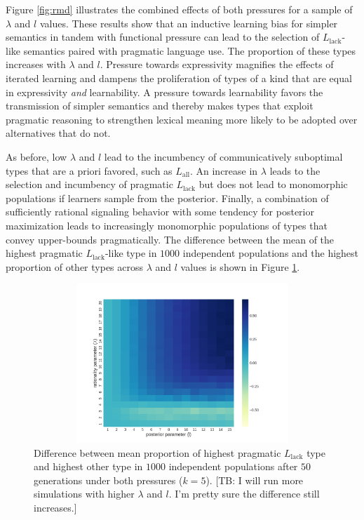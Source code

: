\documentclass[a4paper, 11pt]{article}
\newcommand{\tb}[1]{\textcolor[rgb]{.8,.33,.0}{[TB: #1]}}%
\newcommand{\mylang}[1]{\ensuremath{L_{\text{#1}}}\xspace} %
\newcommand{\Lall}{\mylang{all}}
\newcommand{\Llack}{\mylang{lack}}
\begin{document}
Figure \ref{fig:rmd} illustrates the combined effects of both pressures for a sample of $\lambda$ and $l$ values. These results show that an inductive learning bias for simpler semantics in tandem with functional pressure can lead to the selection of $\Llack$-like semantics paired with pragmatic language use. The proportion of these types increases with $\lambda$ and $l$. Pressure towards expressivity magnifies the effects of iterated learning and dampens the proliferation of types of a kind that are equal in expressivity {\em and} learnability. A pressure towards learnability favors the transmission of simpler semantics and thereby makes types that exploit pragmatic reasoning to strengthen lexical meaning more likely to be adopted over alternatives that do not. %

As before, low $\lambda$ and $l$ lead to the incumbency of communicatively suboptimal types that are a priori favored, such as $\Lall$. An increase in $\lambda$ leads to the selection and incumbency of pragmatic $\Llack$ but does not lead to monomorphic populations if learners sample from the posterior. Finally, a combination of sufficiently rational signaling behavior with some tendency for posterior maximization leads to increasingly monomorphic populations of types that convey upper-bounds pragmatically. The difference between the mean of the highest pragmatic $\Llack$-like type in $1000$ independent populations and the highest proportion of other types across $\lambda$ and $l$ values is shown in Figure \ref{fig:diff}.

\begin{figure}
\centering
\includegraphics[width=1\textwidth,height=6cm,keepaspectratio]{./plots/fig4-incumbents-difference}
\caption{Difference between mean proportion of highest pragmatic $\Llack$ type and highest other type in $1000$ independent populations after $50$ generations under both pressures ($k = 5$). \tb{I will run more simulations with higher $\lambda$ and $l$. I'm pretty sure the difference still increases.}}
\label{fig:diff}
\end{figure}
\end{document}
